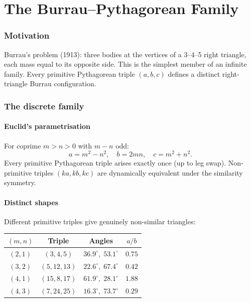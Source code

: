 \documentclass[11pt]{report}
\begin{document}
\newpage
\part{The Burrau--Pythagorean Family}
\label{part:burrau}

\section{Motivation}
\label{sec:burrau_motivation}

Burrau's problem (1913): three bodies at the vertices of a 3--4--5 right triangle, each mass equal to its opposite side. This is the simplest member of an infinite family. Every primitive Pythagorean triple $(a,b,c)$ defines a distinct right-triangle Burrau configuration.

\section{The discrete family}
\label{sec:discrete}

\subsection{Euclid's parametrisation}

For coprime $m>n>0$ with $m-n$ odd:
\begin{equation}
a=m^2-n^2,\quad b=2mn,\quad c=m^2+n^2.
\label{eq:euclid}
\end{equation}
Every primitive Pythagorean triple arises exactly once (up to leg swap). Non-primitive triples $(ka,kb,kc)$ are dynamically equivalent under the similarity symmetry.

\subsection{Distinct shapes}

Different primitive triples give genuinely non-similar triangles:
\begin{center}
\begin{tabular}{cccc}
\toprule
$(m,n)$ & Triple & Angles & $a/b$ \\
\midrule
$(2,1)$ & $(3,4,5)$ & $36.9^\circ,\;53.1^\circ$ & $0.75$ \\
$(3,2)$ & $(5,12,13)$ & $22.6^\circ,\;67.4^\circ$ & $0.42$ \\
$(4,1)$ & $(15,8,17)$ & $61.9^\circ,\;28.1^\circ$ & $1.88$ \\
$(4,3)$ & $(7,24,25)$ & $16.3^\circ,\;73.7^\circ$ & $0.29$ \\
\bottomrule
\end{tabular}
\end{center}
\end{document}
